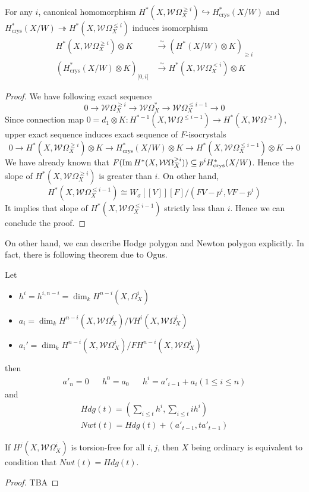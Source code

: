 \documentclass[11pt,a4paper]{scmsnotes}
\begin{document}
\begin{seccor}[Bloch]
For any $i$, canonical homomorphism $H^*(X,\mathcal{W} \Omega^{\geq i}_X) \hookrightarrow H^*_{\text{crys}}(X/W)$ and $H^*_{\text{crys}}(X/W) \twoheadrightarrow H^*(X,\mathcal{W} \Omega^{\leq i}_X)$ induces isomorphism
\begin{align}
H^*(X,\mathcal{W} \Omega_X^{\geq i}) \otimes K &\xrightarrow{\sim} (H^* (X/W) \otimes K )_{\geq i}\\
(H^*_{\text{crys}} (X/W) \otimes K)_{[0,i[} &\xrightarrow{\sim} H^*(X, \mathcal{W} \Omega^{< i}_X) \otimes K  
\end{align}
\end{seccor}
\begin{proof}
We have following exact sequence 
\[
0 \to \mathcal{W} \Omega^{\geq i}_X \to \mathcal{W} \Omega^*_X \to \mathcal{W} \Omega^{\leq i-1}_X \to 0 
\]
Since connection map $0=d_1 \otimes K: H^{*-1}(X, \mathcal{W} \Omega^{\leq i-1}) \to H^*(X,\mathcal{W} \Omega^{\geq i}) $, upper exact sequence induces exact sequence of $F$-isocrystals
\[
0 \to H^*(X, \mathcal{W} \Omega^{\geq i}_X) \otimes K \to H^*_{\text{crys}}(X/W) \otimes K \to H^*(X, \mathcal{W} \Omega^{\leq i-1}_X)\otimes K \to 0
\]
We have already known that $F(\operatorname*{Im} H^*(X,\mathcal{W} \Omega^{\geq i}_X)) \subseteq p^i H^*_{\text{crys}}(X/W)$. Hence the slope of $H^*(X,\mathcal{W} \Omega^{\geq i}_X)$ is greater than $i$.
On other hand, 
\[
H^*(X, \mathcal{W} \Omega^{\leq i-1}_X) \cong  W_\sigma [[V]][F] \big/ (FV-p^{i},VF -p^{i})
\]
It implies that slope of $H^*(X,\mathcal{W} \Omega^{\leq i-1}_X)$ strictly less than $i$. Hence we can conclude the proof.  
\end{proof}

On other hand, we can describe Hodge polygon and Newton polygon explicitly. In fact, there is following theorem due to Ogus.
\begin{secthm}
	Let 
	\begin{itemize}
		\item $h^i = h^{i,n-i} = \dim_k H^{n-i}(X, \Omega^i_X)$
		\item $a_i = \dim_k H^{n-i}(X,\mathcal{W} \Omega_X^i) \big/VH^i(X,\mathcal{W} \Omega_X^i)$
		\item $a_i' = \dim_k H^{n-i}(X,\mathcal{W} \Omega_X^i)\big/FH^{n-i}(X,\mathcal{W} \Omega_X^i)$
	\end{itemize}
then
\[
\begin{aligned}
a'_{n}=0& &h^0 = a_0& &h^i= a'_{i-1}+a_i(1 \leq i \leq n) 
\end{aligned}
\]
and
\[
\begin{aligned}
& Hdg(t)= (\sum_{i\leq t}h^i, \sum_{i\leq t} i h^i)&\\
& Nwt(t)= Hdg(t) + (a'_{t-1}, ta'_{t-1})&
\end{aligned}
\]
\end{secthm}
\begin{seccor}
	\label{ordcor}
	If $H^j(X,\mathcal{W} \Omega_X^i)$ is torsion-free for all $i,j$, then $X$ being ordinary is equivalent to condition that $Nwt(t)= Hdg(t)$.
\end{seccor}
\begin{proof}
	TBA
\end{proof}

\end{document}
